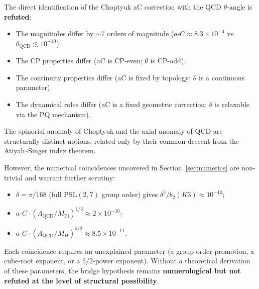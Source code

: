 \documentclass[11pt,a4paper]{article}
\newcommand{\aC}{a\text{-}C}
\newcommand{\LamQ}{\Lambda_{\mathrm{QCD}}}
\newcommand{\MP}{M_{\mathrm{Pl}}}
\newcommand{\PSL}{\mathrm{PSL}}
\theoremstyle{plain}
\theoremstyle{definition}
\theoremstyle{remark}
\begin{document}
\begin{verdict}
The direct identification of the Choptyuk \aC{} correction with the
QCD $\theta$-angle is \textbf{refuted}:
\begin{itemize}[leftmargin=2em,itemsep=0.1em]
  \item The magnitudes differ by $\sim 7$ orders of magnitude
        ($\aC\approx 8.3\times 10^{-4}$ vs
        $\theta_{\mathrm{QCD}}\lesssim 10^{-10}$).
  \item The CP properties differ (\aC{} is CP-even; $\theta$ is CP-odd).
  \item The continuity properties differ (\aC{} is fixed by topology;
        $\theta$ is a continuous parameter).
  \item The dynamical roles differ (\aC{} is a fixed geometric
        correction; $\theta$ is relaxable via the PQ mechanism).
\end{itemize}
The spinorial anomaly of Choptyuk and the axial anomaly of QCD are
structurally distinct notions, related only by their common descent
from the Atiyah--Singer index theorem.

However, the numerical coincidences uncovered in Section~\ref{sec:numerics}
are non-trivial and warrant further scrutiny:
\begin{itemize}[leftmargin=2em,itemsep=0.1em]
  \item $\delta = \pi/168$ (full $\PSL(2,7)$ group order) gives
        $\delta^5/b_2(K3)\approx 10^{-10}$;
  \item $\aC\cdot(\LamQ/\MP)^{1/3}\approx 2\times 10^{-10}$;
  \item $\aC\cdot(\LamQ/M_H)^{5/2}\approx 8.5\times 10^{-11}$.
\end{itemize}
Each coincidence requires an unexplained parameter (a group-order
promotion, a cube-root exponent, or a $5/2$-power exponent).  Without
a theoretical derivation of these parameters, the bridge hypothesis
remains \textbf{numerological but not refuted at the level of
structural possibility}.


\end{verdict}
\end{document}

